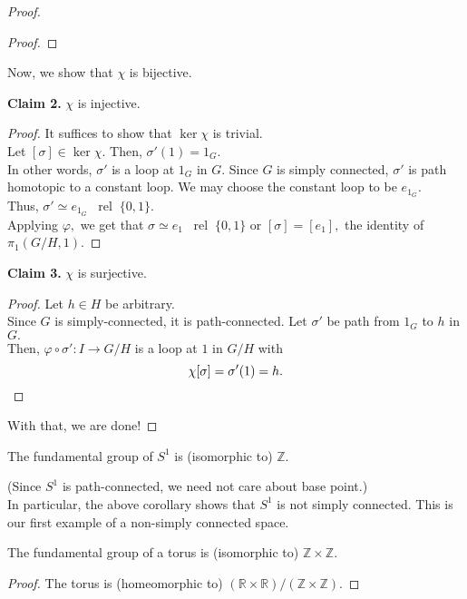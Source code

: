\documentclass[12pt]{article}
\newcommand{\rel}{\;\;\operatorname{rel}\;}
\newenvironment{blockquote}
{\begin{mdframed}[skipabove=0pt, skipbelow=0pt, innertopmargin=4pt, innerbottommargin=4pt, bottomline=false,topline=false,rightline=false, linewidth=2pt]}
{\end{mdframed}}
\begin{document}
\begin{proof}
\begin{blockquote}
\begin{proof}
		\end{proof}
	\end{blockquote}
	Now, we show that $\chi$ is bijective.
	\begin{blockquote}
		\textbf{Claim 2.} $\chi$ is injective.
		\begin{proof} 
			It suffices to show that $\ker \chi$ is trivial.\\
			Let $[\sigma] \in \ker\chi.$ Then, $\sigma'(1) = 1_G.$\\
			In other words, $\sigma'$ is a loop at $1_G$ in $G.$ Since $G$ is simply connected, $\sigma'$ is path homotopic to a constant loop. We may choose the constant loop to be $e_{1_G}.$\\
			Thus, $\sigma' \simeq e_{1_G} \rel \{0, 1\}.$\\
			Applying $\varphi,$ we get that $\sigma \simeq e_1 \rel \{0, 1\}$ or $[\sigma] = [e_1],$ the identity of $\pi_1(G/H, 1).$	
		\end{proof}
	\end{blockquote}
	\begin{blockquote}
		\textbf{Claim 3.} $\chi$ is surjective.	
		\begin{proof} 
			Let $h \in H$ be arbitrary.\\
			Since $G$ is simply-connected, it is path-connected. Let $\sigma'$ be path from $1_G$ to $h$ in $G.$\\
			Then, $\varphi\circ\sigma':I\to G/H$ is a loop at $1$ in $G/H$ with
			\begin{equation*} 
				\chi[\sigma] = \sigma'(1) = h. \qedhere
			\end{equation*}
		\end{proof}
	\end{blockquote}
	With that, we are done!
\end{proof}
\begin{cor}
	The fundamental group of $S^1$ is (isomorphic to) $\mathbb{Z}.$
\end{cor}
(Since $S^1$ is path-connected, we need not care about base point.)\\
In particular, the above corollary shows that $S^1$ is not simply connected. This is our first example of a non-simply connected space.
\begin{cor}
	The fundamental group of a torus is (isomorphic to) $\mathbb{Z} \times \mathbb{Z}.$
\end{cor}
\begin{proof} 
	The torus is (homeomorphic to) $(\mathbb{R} \times \mathbb{R})/(\mathbb{Z} \times \mathbb{Z}).$
\end{proof}
\end{document}
